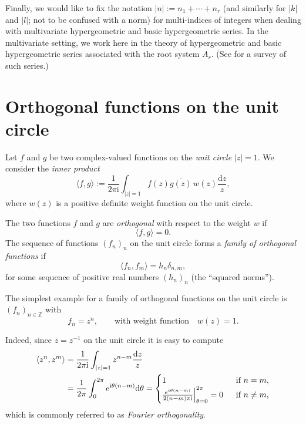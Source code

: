 \documentclass[reqno,12pt]{amsart}
\theoremstyle{remark}
\numberwithin{equation}{section}
\newcommand{\Z}{\mathbb Z}
\begin{document}
Finally, we would like to fix the notation
$|n|:=n_1+\cdots+n_r$ (and similarly for $|k|$ and $|l|$;
not to be confused with a norm)
for multi-indices of integers when dealing with
multivariate hypergeometric and basic hypergeometric series.
In the multivariate setting, we work here in the theory of hypergeometric
and basic hypergeometric series associated with the root system $A_r$.
(See \cite{S8} for a survey of such series.)


\section[Orthogonal functions on the unit circle]{Orthogonal functions
on the unit circle}\label{sec:of}

Let $f$ and $g$ be two complex-valued functions on the
\textit{unit circle} $|z|=1$. 
We consider the \textit{inner product}
\begin{equation*}
\langle f,g\rangle:=\frac 1{2\pi\mathrm i}\int_{|z|=1}
f(z)\overline{g(z)}\,w(z)\frac{{\mathrm d}z}z,
\end{equation*}
where $w(z)$ is a positive definite weight function on the unit circle.

The two functions $f$ and $g$ are \textit{orthogonal}
with respect to the weight $w$ if
\begin{equation*}
\langle f,g\rangle=0.
\end{equation*}
The sequence of functions $(f_n)_n$ on the unit circle
forms a \textit{family of orthogonal functions} if
\begin{equation*}
\langle f_n,f_m\rangle=h_n\delta_{n,m},
\end{equation*}
for some sequence of positive real numbers $(h_n)_n$
(the ``squared norms'').

The simplest example for a family of orthogonal functions
on the unit circle is $(f_n)_{n\in\Z}$ with
\begin{equation*}
f_n=z^n,\qquad\text{with weight function}\quad w(z)=1.
\end{equation*}

Indeed, since $\overline{z}=z^{-1}$ on the unit circle it is easy to compute
\begin{align}\label{eq:Fo}
\langle z^n,z^m\rangle&=\frac 1{2\pi\mathrm i}\int_{|z|=1}
z^{n-m}\frac{{\mathrm d}z}z\notag\\&=\frac 1{2\pi}\int_{0}^{2\pi}
e^{\mathrm i\theta(n-m)}{\mathrm d}\theta=
\begin{cases}1&\;\;\text{if $n=m$},\\
\frac{e^{i\theta(n-m)}}{2(n-m)\pi\mathrm i}\Big|_{\theta=0}^{2\pi}=0
&\;\;\text{if $n\ne m$},
\end{cases}
\end{align}
which is commonly referred to as \textit{Fourier orthogonality}.
\end{document}
